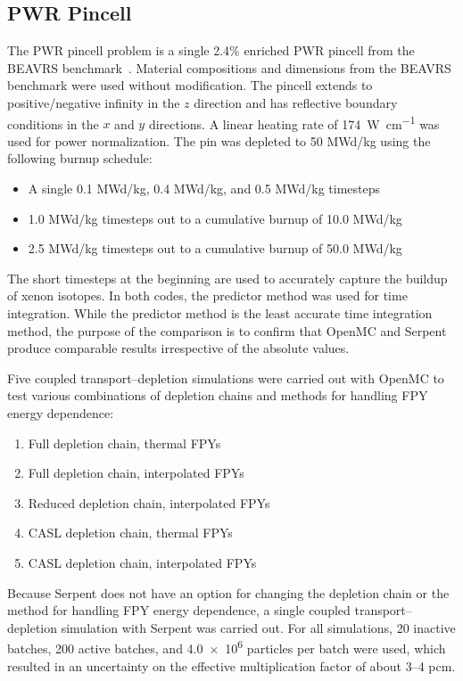 \documentclass[3p,authoryear]{elsarticle}
\begin{document}
\subsection{PWR Pincell}

The PWR pincell problem is a single 2.4\% enriched PWR pincell from the BEAVRS
benchmark~\citep{horelik2013mc,horelik2018mit}. Material compositions and
dimensions from the BEAVRS benchmark were used without modification. The pincell
extends to positive/negative infinity in the $z$ direction and has reflective
boundary conditions in the $x$ and $y$ directions. A linear heating rate of
\SI{174}{\watt\per\centi\meter} was used for power normalization. The pin was
depleted to 50 MWd/kg using the following burnup schedule:
\begin{itemize}
  \item A single 0.1 MWd/kg, 0.4 MWd/kg, and 0.5 MWd/kg timesteps
  \item 1.0 MWd/kg timesteps out to a cumulative burnup of 10.0 MWd/kg
  \item 2.5 MWd/kg timesteps out to a cumulative burnup of 50.0 MWd/kg
\end{itemize}
The short timesteps at the beginning are used to accurately capture the buildup
of xenon isotopes. In both codes, the predictor method was used for time
integration. While the predictor method is the least accurate time integration
method, the purpose of the comparison is to confirm that OpenMC and Serpent
produce comparable results irrespective of the absolute values.

Five coupled transport--depletion simulations were carried out with OpenMC to test
various combinations of depletion chains and methods for handling FPY
energy dependence:
\begin{enumerate}
  \item Full depletion chain, thermal FPYs
  \item Full depletion chain, interpolated FPYs
  \item Reduced depletion chain, interpolated FPYs
  \item CASL depletion chain, thermal FPYs
  \item CASL depletion chain, interpolated FPYs
\end{enumerate}
Because Serpent does not have an option for changing the depletion chain or the
method for handling FPY energy dependence, a single coupled transport--depletion
simulation with Serpent was carried out. For all simulations, 20 inactive
batches, 200 active batches, and \num{4.0e6} particles per batch were used,
which resulted in an uncertainty on the effective multiplication factor of about
3--4 pcm.
\end{document}
